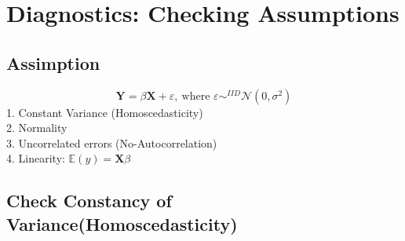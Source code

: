 \documentclass[11pt,a4paper]{article}
\begin{document}
\section{Diagnostics: Checking Assumptions}
\subsection{Assimption}
$$\mathbf{Y}=\beta \mathbf{X}+\varepsilon,\ \text{where }\varepsilon\sim^{IID} \mathcal{N}(0,\sigma^2)$$
1. Constant Variance (Homoscedasticity)\\
2. Normality\\
3. Uncorrelated errors (No-Autocorrelation)\\
4. Linearity: $\mathbb{E}(y)=\mathbf{X}\beta$

\subsection{Check Constancy of Variance(Homoscedasticity)}
\end{document}
